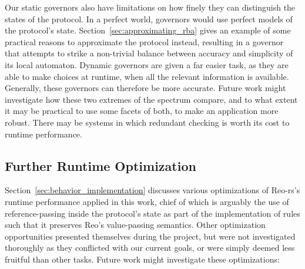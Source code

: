 Our static governors also have limitations on how finely they can distinguish the states of the protocol. In a perfect world, governors would use perfect models of the protocol's state. Section~\ref{sec:approximating_rba} gives an example of some practical reasons to approximate the protocol instead, resulting in a governor that attempts to strike a non-trivial balance between accuracy and simplicity of its local automaton. Dynamic governors are given a far easier task, as they are able to make choices at runtime, when all the relevant information is available. Generally, these governors can therefore be more accurate. Future work might investigate how these two extremes of the spectrum compare, and to what extent it may be practical to use some facets of both, to make an application more robust. There may be systems in which redundant checking is worth its cost to runtime performance.

\subsection{Further Runtime Optimization}
Section~\ref{sec:behavior_implementation} discusses various optimizations of Reo-rs's runtime performance applied in this work, chief of which is arguably the use of reference-passing inside the protocol's state as part of the implementation of rules such that it preserves Reo's value-passing semantics. Other optimization opportunities presented themselves during the project, but were not investigated thoroughly as they conflicted with our current goals, or were simply deemed less fruitful than other tasks. Future work might investigate these optimizations:


